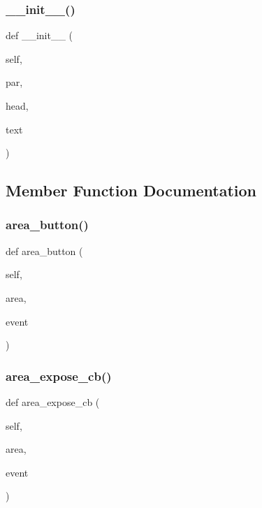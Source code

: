 \subsubsection{\texorpdfstring{\+\_\+\+\_\+init\+\_\+\+\_\+()}{\_\_init\_\_()}}
{\footnotesize\ttfamily def \+\_\+\+\_\+init\+\_\+\+\_\+ (\begin{DoxyParamCaption}\item[{}]{self,  }\item[{}]{par,  }\item[{}]{head,  }\item[{}]{text }\end{DoxyParamCaption})}



\subsection{Member Function Documentation}
\mbox{\label{classyellow_1_1stick_doc_a260d37924dae7e20867bbd197b9044ee}} 
\subsubsection{\texorpdfstring{area\+\_\+button()}{area\_button()}}
{\footnotesize\ttfamily def area\+\_\+button (\begin{DoxyParamCaption}\item[{}]{self,  }\item[{}]{area,  }\item[{}]{event }\end{DoxyParamCaption})}

\mbox{\label{classyellow_1_1stick_doc_a0730446d6038be2aa7f41b6a0262dfbe}} 
\subsubsection{\texorpdfstring{area\+\_\+expose\+\_\+cb()}{area\_expose\_cb()}}
{\footnotesize\ttfamily def area\+\_\+expose\+\_\+cb (\begin{DoxyParamCaption}\item[{}]{self,  }\item[{}]{area,  }\item[{}]{event }\end{DoxyParamCaption})}

